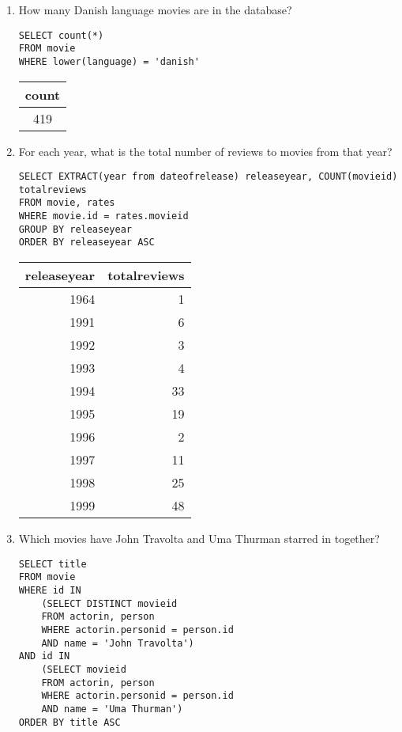 \begin{enumerate}
\item How many Danish language movies are in the database?

\begin{lstlisting}
SELECT count(*)
FROM movie
WHERE lower(language) = 'danish'
\end{lstlisting}

\begin{tabular}{|c|}
\hline
count \\ \hline
419 \\ \hline
\end{tabular}

\item For each year, what is the total number of reviews to movies from that year?

\begin{lstlisting}
SELECT EXTRACT(year from dateofrelease) releaseyear, COUNT(movieid) totalreviews
FROM movie, rates
WHERE movie.id = rates.movieid
GROUP BY releaseyear
ORDER BY releaseyear ASC
\end{lstlisting}

\begin{tabular}{|r|r|}
\hline
releaseyear & totalreviews \\ \hline
1964 & 1 \\ \hline
1991 & 6 \\ \hline
1992 & 3 \\ \hline
1993 & 4 \\ \hline
1994 & 33 \\ \hline
1995 & 19 \\ \hline
1996 & 2 \\ \hline
1997 & 11 \\ \hline
1998 & 25 \\ \hline
1999 & 48 \\ \hline
\end{tabular}


\item Which movies have John Travolta and Uma Thurman starred in together?

\begin{lstlisting}
SELECT title
FROM movie
WHERE id IN
	(SELECT DISTINCT movieid
	FROM actorin, person
	WHERE actorin.personid = person.id
	AND name = 'John Travolta')
AND id IN
	(SELECT movieid
	FROM actorin, person
	WHERE actorin.personid = person.id
	AND name = 'Uma Thurman')
ORDER BY title ASC
\end{lstlisting}


\end{enumerate}
